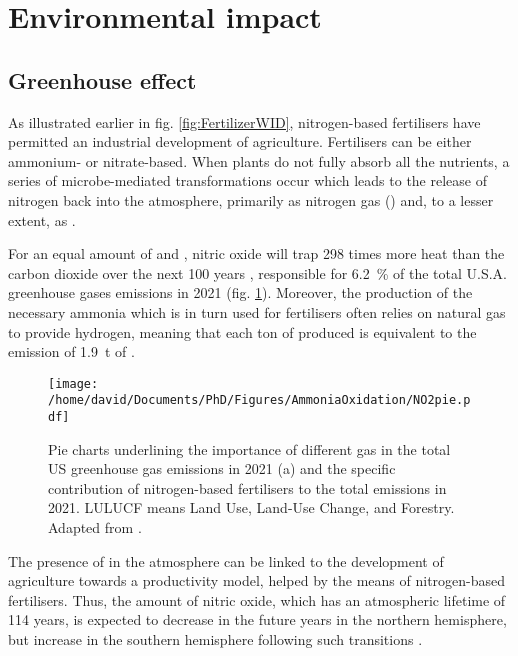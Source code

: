 \section{Environmental impact}

\subsection{Greenhouse effect}

As illustrated earlier in fig. \ref{fig:FertilizerWID}, nitrogen-based fertilisers have permitted an industrial development of agriculture.
Fertilisers can be either ammonium- or nitrate-based.
When plants do not fully absorb all the nutrients, a series of microbe-mediated transformations occur which leads to the release of nitrogen back into the atmosphere, primarily as nitrogen gas () and, to a lesser extent, as .

For an equal amount of  and , nitric oxide will trap \num{298} times more heat than the carbon dioxide over the next 100 years \parencite{MITCLIMATE}, responsible for \qty{6.2}{\percent} of the total U.S.A. greenhouse gases emissions in 2021 (fig. \ref{fig:PieGreenhouseNO2}).
Moreover, the production of the necessary ammonia which is in turn used for fertilisers often relies on natural gas to provide hydrogen, meaning that each ton of  produced is equivalent to the emission of \qty{1.9}{\tonne} of  \parencite{Rafiqul2005, Chen2018}.

\begin{figure}[!htb]
    \centering
    \texttt{[image: /home/david/Documents/PhD/Figures/AmmoniaOxidation/NO2pie.pdf]}
    \caption{
    Pie charts underlining the importance of different gas in the total US greenhouse gas emissions in 2021 (a) and the specific contribution of nitrogen-based fertilisers to the total  emissions in 2021.
    LULUCF means Land Use, Land-Use Change, and Forestry.
    Adapted from \cite{EPAGreenhouseGases}.
    }
    \label{fig:PieGreenhouseNO2}
\end{figure}

The presence of  in the atmosphere can be linked to the development of agriculture towards a productivity model, helped by the means of nitrogen-based fertilisers.
Thus, the amount of nitric oxide, which has an atmospheric lifetime of 114 years, is expected to decrease in the future years in the northern hemisphere, but increase in the southern hemisphere following such transitions \parencite{Solomon2007, Davidson2009}.

